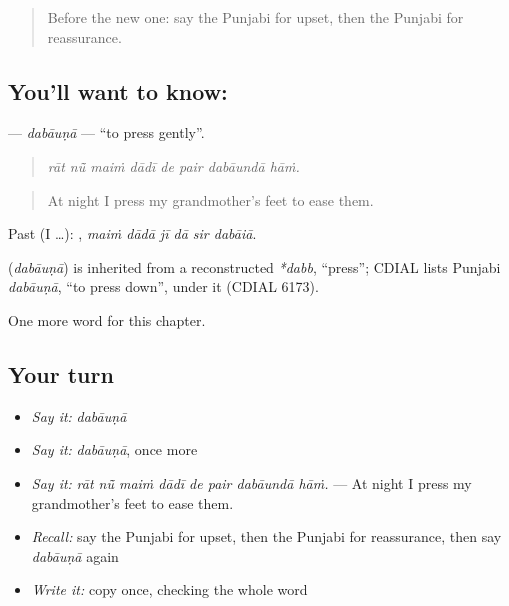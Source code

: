 \label{lesson:PA-C328-dabauna}



\begin{quote}
Before the new one: say the Punjabi for upset, then the Punjabi for reassurance.
\end{quote}

\subsection*{You'll want to know: }
\textbf{} — \emph{dabāuṇā} — \textquotedblleft{}to press gently\textquotedblright{}.

\begin{quote}
       
\end{quote}

\begin{quote}
\emph{rāt nū̃ maiṁ dādī de pair dabāundā hāṁ.}
\end{quote}

\begin{quote}
At night I press my grandmother's feet to ease them.
\end{quote}

Past (I …):      , \emph{maiṁ dādā jī dā sir dabāiā}.

\begin{cousinweb}
\textbf{} (\emph{dabāuṇā}) is inherited from a reconstructed \emph{*dabb}, \textquotedblleft{}press\textquotedblright{}; CDIAL lists Punjabi \emph{dabāuṇā}, \textquotedblleft{}to press down\textquotedblright{}, under it (CDIAL 6173).
\end{cousinweb}

\begin{grammarlens}[title={What you've built}]
One more word for this chapter.
\end{grammarlens}

\subsection*{Your turn}
\begin{itemize}
\raggedright
  \item \emph{Say it:} \emph{dabāuṇā}
  \item \emph{Say it:} \emph{dabāuṇā}, once more
  \item \emph{Say it:} \emph{rāt nū̃ maiṁ dādī de pair dabāundā hāṁ.} — At night I press my grandmother's feet to ease them.
  \item \emph{Recall:} say the Punjabi for upset, then the Punjabi for reassurance, then say \emph{dabāuṇā} again
  \item \emph{Write it:} copy \textbf{} once, checking the whole word
\end{itemize}

